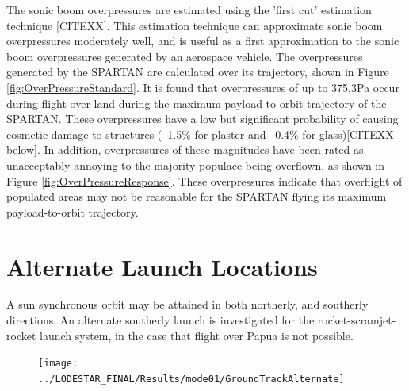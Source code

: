 The sonic boom overpressures are estimated using the 'first cut' estimation technique [CITEXX]. This estimation technique can approximate sonic boom overpressures moderately well, and is useful as a first approximation to the sonic boom overpressures generated by an aerospace vehicle. The overpressures generated by the SPARTAN are calculated over its trajectory, shown in Figure \ref{fig:OverPressureStandard}. It is found that overpressures of up to 375.3Pa occur during flight over land during the maximum payload-to-orbit trajectory of the SPARTAN. These overpressures have a low but significant probability of causing cosmetic damage to structures (~1.5\% for plaster and ~0.4\% for glass)[CITEXX-below]. In addition, overpressures of these magnitudes have been rated as unacceptably annoying to the majority populace being overflown, as shown in Figure \ref{fig:OverPressureResponse}. 
These overpressures indicate that overflight of populated areas may not be reasonable for the SPARTAN flying its maximum payload-to-orbit trajectory. 







\section{Alternate Launch Locations}

A sun synchronous orbit may be attained in both northerly, and southerly directions. An alternate southerly launch is investigated for the rocket-scramjet-rocket launch system, in the case that flight over Papua is not possible. 


\begin{figure}[th]
\centering
\texttt{[image: ../LODESTAR\_FINAL/Results/mode01/GroundTrackAlternate]}
\caption{}
\label{fig:GroundTrackAlternate}
\end{figure}

